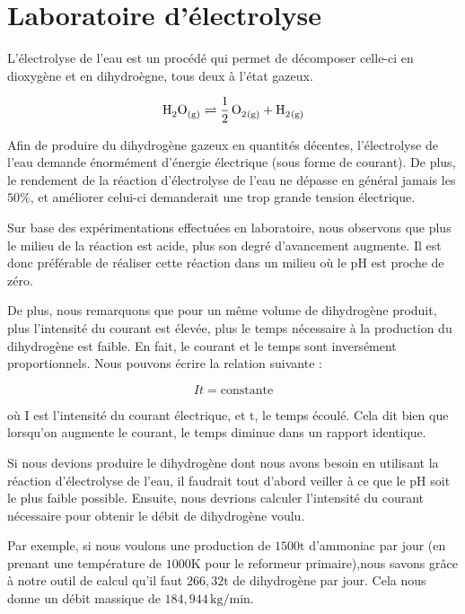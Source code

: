 \documentclass[a4paper, oneside, 12pt]{article}
\begin{document}
\section{Laboratoire d’électrolyse}

L'électrolyse de l'eau est un procédé qui permet de décomposer celle-ci en dioxygène et en dihydroègne, tous deux à l'état gazeux.

\begin{equation*}
	\ce{H2O_{(g)} \rightleftharpoons \frac{1}{2} \, O2_{(g)} + H2_{(g)}} 
\end{equation*}

Afin de produire du dihydrogène gazeux en quantités décentes, l'électrolyse de l'eau 
demande énormément d'énergie électrique (sous forme de courant). De plus, le rendement
de la réaction d'électrolyse de l'eau ne dépasse en général jamais les $50\%$, 
et améliorer celui-ci demanderait une trop grande tension électrique.

Sur base des expérimentations effectuées en laboratoire, nous observons que plus 
le milieu de la réaction est acide, plus son degré d'avancement augmente. Il est donc
préférable de réaliser cette réaction dans un milieu où le pH est proche de zéro.

De plus, nous remarquons que pour un même volume de dihydrogène produit, plus l’intensité du courant est élevée, plus le temps nécessaire à la production du dihydrogène est faible. En fait, le courant et le temps sont inversément proportionnels. Nous pouvons écrire la relation suivante :


\begin{equation*}
	It = \text{constante}
\end{equation*}

où I est l'intensité du courant électrique, et t, le temps écoulé. Cela dit bien que lorsqu'on augmente le courant, le temps diminue dans un rapport identique.

Si nous devions produire le dihydrogène dont nous avons besoin en utilisant la réaction d'électrolyse de l'eau, il faudrait tout d'abord veiller à ce que le pH soit le
plus faible possible. Ensuite, nous devrions calculer l'intensité du courant nécessaire pour obtenir le débit de dihydrogène voulu.

Par exemple, si nous voulons une production de $1500 \si{\tonne}$ d'ammoniac par jour (en prenant une température de $1000 \si{\kelvin}$ pour le reformeur primaire),nous savons grâce à notre outil de calcul qu'il faut $266,32 \si{\tonne}$ de dihydrogène par jour. Cela nous donne un débit massique de $184,944 \, \si{\kilo\gram/\minute}$.
\end{document}
